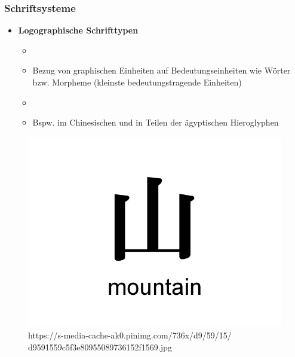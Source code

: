 


\begin{frame}
\frametitle{Schriftsysteme}

\begin{itemize}
	\item \textbf{Logographische Schrifttypen}
	
	\begin{itemize}
		\item[]
		\item Bezug von graphischen Einheiten auf Bedeutungseinheiten wie Wörter bzw. Morpheme (kleinste bedeutungstragende Einheiten) 
		\item[]
		\item Bspw. im Chinesischen und in Teilen der ägyptischen Hieroglyphen
		
		
		\end{itemize}
\end{itemize}
		
	\begin{minipage}{.48\textwidth}
	
	\begin{figure}
	\centering
	\includegraphics[scale=.1]{material/04ChineseMountain}
	\caption[chinese]{https://s-media-cache-ak0.pinimg.com/736x/d9/59/15/ d9591559c5f3e80955089736152f1569.jpg}
	\end{figure}
	
	\end{minipage}\hfill%
	\begin{minipage}{.48\textwidth}
	

\end{minipage}
\end{frame}
